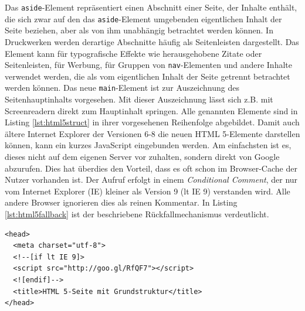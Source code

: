Das \texttt{aside}-Element repräsentiert einen Abschnitt einer Seite, der Inhalte enthält, die sich zwar auf den das \texttt{aside}-Element umgebenden eigentlichen Inhalt der Seite beziehen, aber als von ihm unabhängig betrachtet werden können. In Druckwerken werden derartige Abschnitte häufig als Seitenleisten dargestellt. Das Element kann für typografische Effekte wie herausgehobene Zitate oder Seitenleisten, für Werbung, für Gruppen von \texttt{nav}-Elementen und andere Inhalte verwendet werden, die als vom eigentlichen Inhalt der Seite getrennt betrachtet werden können.\grqq{}\cite[S.43]{PilgDurc2011} Das neue \texttt{main}-Element ist zur Auszeichnung des Seitenhauptinhalts vorgesehen. Mit dieser Auszeichnung lässt sich z.B. mit Screenreadern direkt zum Hauptinhalt springen.  Alle genannten Elemente sind in Listing \ref{lst:html5struct} in ihrer vorgesehenen Reihenfolge abgebildet. \glqq Damit auch ältere Internet Explorer der Versionen 6-8 die neuen HTML 5-Elemente darstellen können, kann ein kurzes JavaScript eingebunden werden. Am einfachsten ist es, dieses nicht auf dem eigenen Server vor zuhalten, sondern direkt von Google abzurufen. Dies hat überdies den Vorteil, dass es oft schon im Browser-Cache der Nutzer vorhanden ist. Der Aufruf erfolgt in einem \textit{Conditional Comment}, der nur vom Internet Explorer (IE) kleiner als Version 9 (lt IE 9) verstanden wird. Alle andere Browser ignorieren dies als reinen Kommentar.\grqq{}\cite{SelfHtml20143} In Listing \ref{lst:html5fallback}	 ist der beschriebene Rückfallmechanismus verdeutlicht.

\vspace{1em}
\begin{lstlisting}[language=HTML5, caption=HTML 5 Internet Explorer Fallback, label=lst:html5fallback]
<head>
  <meta charset="utf-8">
  <!--[if lt IE 9]>
  <script src="http://goo.gl/RfQF7"></script>
  <![endif]-->
  <title>HTML 5-Seite mit Grundstruktur</title>
</head>
\end{lstlisting}
	
